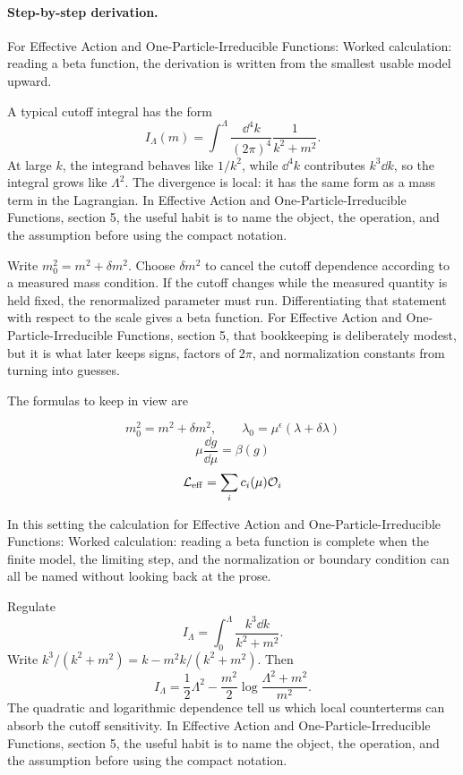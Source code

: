 \paragraph{Step-by-step derivation.}

For Effective Action and One-Particle-Irreducible Functions: Worked calculation: reading a beta function, the derivation is written from the smallest usable model upward.

A typical cutoff integral has the form
\[
  I_\Lambda(m)=\int^{\Lambda}\frac{\dd^4k}{(2\pi)^4}\frac{1}{k^2+m^2}.
\]
At large \(k\), the integrand behaves like \(1/k^2\), while \(\dd^4k\) contributes \(k^3\dd k\), so the integral grows like \(\Lambda^2\).  The divergence is local: it has the same form as a mass term in the Lagrangian.  In Effective Action and One-Particle-Irreducible Functions, section 5, the useful habit is to name the object, the operation, and the assumption before using the compact notation.

Write \(m_0^2=m^2+\delta m^2\).  Choose \(\delta m^2\) to cancel the cutoff dependence according to a measured mass condition.  If the cutoff changes while the measured quantity is held fixed, the renormalized parameter must run.  Differentiating that statement with respect to the scale gives a beta function.  For Effective Action and One-Particle-Irreducible Functions, section 5, that bookkeeping is deliberately modest, but it is what later keeps signs, factors of \(2\pi\), and normalization constants from turning into guesses.

The formulas to keep in view are

\[
  m_0^2=m^2+\delta m^2,\qquad \lambda_0=\mu^\epsilon(\lambda+\delta\lambda)
\]
\[
  \mu\frac{\dd g}{\dd\mu}=\beta(g)
\]
\[
  \mathcal L_{\mathrm{eff}}=\sum_i c_i(\mu)\mathcal O_i
\]

In this setting the calculation for Effective Action and One-Particle-Irreducible Functions: Worked calculation: reading a beta function is complete when the finite model, the limiting step, and the normalization or boundary condition can all be named without looking back at the prose.




\begin{example}
Regulate
\[
  I_\Lambda=\int_0^\Lambda\frac{k^3\dd k}{k^2+m^2}.
\]
Write \(k^3/(k^2+m^2)=k-m^2k/(k^2+m^2)\).  Then
\[
  I_\Lambda=\frac12\Lambda^2-\frac{m^2}{2}\log\frac{\Lambda^2+m^2}{m^2}.
\]
The quadratic and logarithmic dependence tell us which local counterterms can absorb the cutoff sensitivity.  In Effective Action and One-Particle-Irreducible Functions, section 5, the useful habit is to name the object, the operation, and the assumption before using the compact notation.
\end{example}




